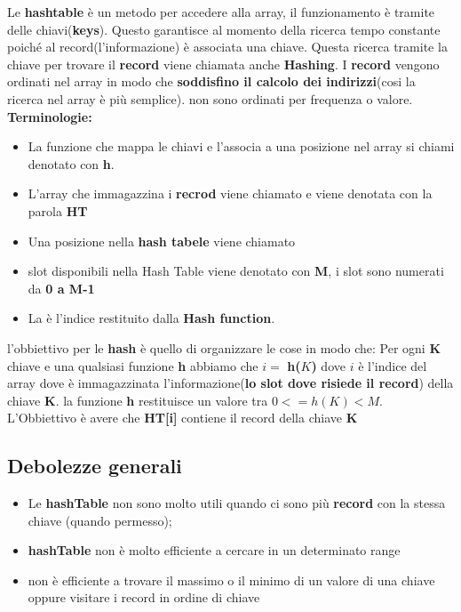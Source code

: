 Le \textbf{hashtable} è un metodo per accedere alla array, il funzionamento è tramite delle chiavi(\textbf{keys}). Questo garantisce al momento della ricerca tempo constante poiché al record(l'informazione) è associata una chiave. Questa ricerca tramite la chiave per trovare il \textbf{record} viene chiamata anche \textbf{Hashing}.
I \textbf{record} vengono ordinati nel array in modo che \textbf{soddisfino il calcolo dei indirizzi}(cosi la ricerca nel array è più semplice). non sono ordinati per frequenza o valore.\newline\newline
\textbf{Terminologie:}
\begin{itemize}
    \item La funzione che mappa le chiavi e l'associa a una posizione nel array si chiami \textbf{\textcolor{blue}{}} denotato con \textbf{h}.
    \item  L'array che immagazzina i \textbf{recrod} viene chiamato \textbf{\textcolor{blue}{}} e viene denotata con la parola \textbf{HT}
    \item Una posizione nella \textbf{hash tabele} viene chiamato \textbf{\textcolor{blue}{}}
    \item slot disponibili nella Hash Table viene denotato con \textbf{M}, i slot sono numerati da \textbf{0 a M-1}
    \item La \textbf{\textcolor{blue}{}} è l'indice restituito dalla \textbf{Hash function}.
\end{itemize}
l'obbiettivo per le \textbf{hash} è quello di organizzare le cose in modo che: Per ogni \textbf{K} chiave e una qualsiasi funzione \textbf{h} abbiamo che  $i =$ \textbf{h($K$)} dove $i$ è l'indice del array dove è immagazzinata l'informazione(\textbf{lo slot dove risiede il record}) della chiave \textbf{K}. la funzione \textbf{h} restituisce un valore tra $0 <= h(K) < M$. L'Obbiettivo è avere che \textbf{HT[i]} contiene il record della chiave \textbf{K}

\subsection{Debolezze generali}
\begin{itemize}
    \item Le \textbf{hashTable} non sono molto utili quando ci sono più \textbf{record} con la stessa chiave (quando permesso);
    \item \textbf{hashTable} non è molto efficiente a cercare in un determinato range
    \item non è efficiente a trovare il massimo o il minimo di un valore di una chiave oppure visitare i record in ordine di chiave
\end{itemize}

